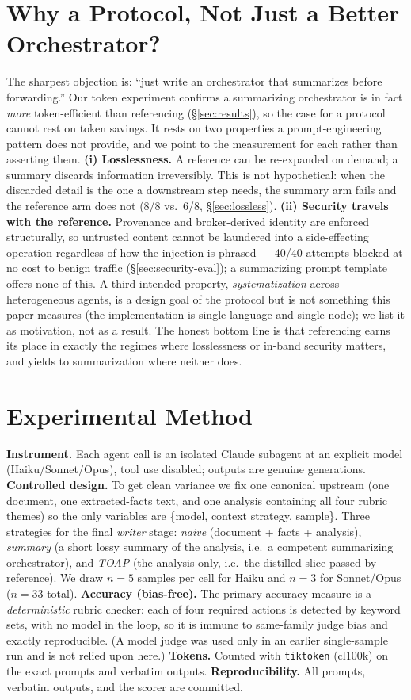 \documentclass[11pt]{article}
\begin{document}
\section{Why a Protocol, Not Just a Better Orchestrator?}\label{sec:why}
The sharpest objection is: ``just write an orchestrator that summarizes before forwarding.'' Our token
experiment confirms a summarizing orchestrator is in fact \emph{more} token-efficient than referencing
(\S\ref{sec:results}), so the case for a protocol cannot rest on token savings. It rests on two
properties a prompt-engineering pattern does not provide, and we point to the measurement for each
rather than asserting them. \textbf{(i) Losslessness.} A reference can be re-expanded on demand; a
summary discards information irreversibly. This is not hypothetical: when the discarded detail is the
one a downstream step needs, the summary arm fails and the reference arm does not (8/8 vs.\ 6/8,
\S\ref{sec:lossless}). \textbf{(ii) Security travels with the reference.} Provenance and broker-derived
identity are enforced structurally, so untrusted content cannot be laundered into a side-effecting
operation regardless of how the injection is phrased --- 40/40 attempts blocked at no cost to benign
traffic (\S\ref{sec:security-eval}); a summarizing prompt template offers none of this. A third
intended property, \emph{systematization} across heterogeneous agents, is a design goal of the protocol
but is not something this paper measures (the implementation is single-language and single-node); we
list it as motivation, not as a result. The honest bottom line is that referencing earns its place in
exactly the regimes where losslessness or in-band security matters, and yields to summarization where
neither does.

\section{Experimental Method}\label{sec:method}
\textbf{Instrument.} Each agent call is an isolated Claude subagent at an explicit model
(Haiku/Sonnet/Opus), tool use disabled; outputs are genuine generations.
\textbf{Controlled design.} To get clean variance we fix one canonical upstream (one document, one
extracted-facts text, and one analysis containing all four rubric themes) so the only variables are
\{model, context strategy, sample\}. Three strategies for the final \emph{writer} stage:
\emph{naive} (document + facts + analysis), \emph{summary} (a short lossy summary of the analysis,
i.e.\ a competent summarizing orchestrator), and \emph{TOAP} (the analysis only, i.e.\ the distilled
slice passed by reference). We draw $n{=}5$ samples per cell for Haiku and $n{=}3$ for Sonnet/Opus
($n{=}33$ total).
\textbf{Accuracy (bias-free).} The primary accuracy measure is a \emph{deterministic} rubric checker:
each of four required actions is detected by keyword sets, with no model in the loop, so it is immune
to same-family judge bias and exactly reproducible. (A model judge was used only in an earlier
single-sample run and is not relied upon here.)
\textbf{Tokens.} Counted with \texttt{tiktoken} (cl100k) on the exact prompts and verbatim outputs.
\textbf{Reproducibility.} All prompts, verbatim outputs, and the scorer are committed.
\end{document}
